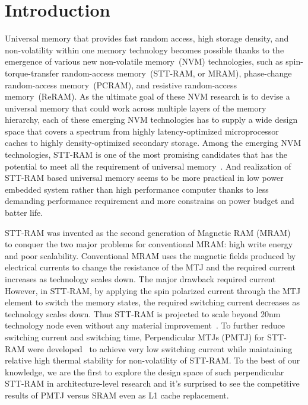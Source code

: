 \section{Introduction} \label{sec:intro}

Universal memory that provides fast random access, high storage density, and non-volatility within one memory technology becomes possible thanks to the emergence of various new non-volatile memory~(NVM) technologies, such as spin-torque-transfer random-access memory~(STT-RAM, or MRAM), phase-change random-access memory~(PCRAM), and resistive random-access memory~(ReRAM). As the ultimate
goal of these NVM research is to devise a universal memory that could work across multiple layers of the memory hierarchy, each of these emerging NVM technologies has to supply a wide design space that covers a spectrum from highly latency-optimized microprocessor caches to highly density-optimized secondary storage. Among the emerging NVM technologies, STT-RAM is one of the most promising candidates that has the potential to meet all the requirement of universal memory~\cite{STTRAM:Review10B,STTRAM:Review10A}. And realization of STT-RAM based universal memory seems to be more practical in low power embedded system rather than high performance computer thanks to less demanding performance requirement and more constrains on power budget and batter life.

STT-RAM was invented as the second generation of Magnetic RAM (MRAM)~\cite{STTRAM:IEDM05} to conquer the two major problems for conventional MRAM: high write energy and poor scalability. Conventional MRAM uses the magnetic fields produced by electrical currents
to change the resistance of the MTJ and the required current increases as technology scales down. The major drawback required current However, in STT-RAM, by applying the spin polarized current through the MTJ element to switch the memory states, the required switching current decreases as technology scales down. Thus STT-RAM is projected to scale beyond 20nm technology node even without any material improvement~\cite{STTRAM:Grandis11}. To further reduce switching current and switching time, Perpendicular MTJs (PMTJ) for STT-RAM were developed~\cite{PMTJ:APL06,PMTJ:APL11,PMTJ:Grandis10,PMTJ:Toshiba08,PMTJ:Xiaochun06} to achieve very low switching current while maintaining relative high thermal stability for non-volatility of STT-RAM. To the best of our knowledge, we are the first to explore the design space of such perpendicular STT-RAM in architecture-level research and it's surprised to see the competitive results of PMTJ versus SRAM even as L1 cache replacement.

